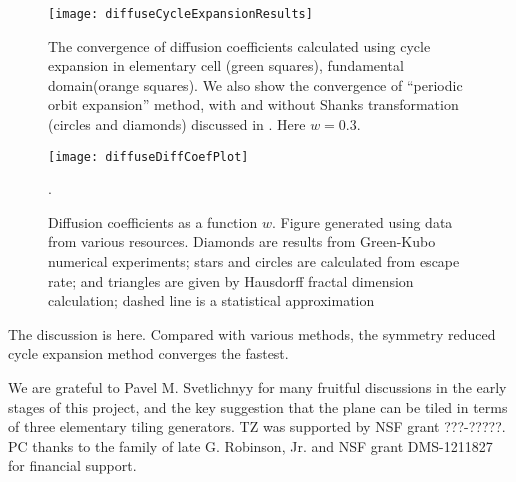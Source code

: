 \documentclass[aps,pre,
                showpacs,
                twocolumn,
                groupedaddress,
                floatfix]{revtex4-1}
\begin{document}
\begin{figure}[htbp]
  \texttt{[image: diffuseCycleExpansionResults]}
  \caption[]{\label{fig-results} The convergence of diffusion coefficients
  calculated using cycle expansion in elementary cell (green squares),
  fundamental domain(orange squares). We
  also show the convergence of ``periodic orbit expansion'' method, with and
  without Shanks transformation (circles and diamonds) discussed in
  . Here $w = 0.3$.
  }
\end{figure}

\begin{figure}
\texttt{[image: diffuseDiffCoefPlot]}
  \caption[]{\label{fig-results} Diffusion coefficients as a function $w$.
  Figure generated using data from various resources. Diamonds are results from
  Green-Kubo numerical experiments; stars and
  circles are calculated from escape rate; and triangles are
  given by Hausdorff fractal dimension calculation; dashed line
  is a statistical approximation}.
\end{figure}
The discussion is here. Compared with various methods, the symmetry reduced
cycle expansion method converges the fastest.


\begin{acknowledgments}
We are grateful to Pavel M. Svetlichnyy for many fruitful discussions in the
early stages of this project, and the key suggestion that the plane can be tiled
in terms of three elementary tiling generators. TZ was supported by NSF grant
???-?????. PC thanks to the family of late G. Robinson, Jr. and NSF grant
DMS-1211827 for financial support.
\end{acknowledgments}

\ifboyscout
\newpage
    
\fi




% 
\end{document}
